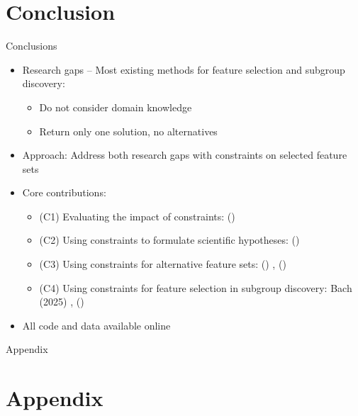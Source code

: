 \documentclass[en, navbarinline, handout]{sdqbeamer}
\renewcommand{\textcite}[1]{\citeauthor{#1} (\citeyear{#1}) \cite{#1}}  %
\begin{document}
\section{Conclusion}

\begin{frame}[t]{Conclusions}
	\begin{itemize}
		\item Research gaps -- Most existing methods for feature selection and subgroup discovery:
		\begin{itemize}
			\item Do not consider domain knowledge
			\item Return only one solution, no alternatives
		\end{itemize}
		\pause
		\vspace{\baselineskip}
		\item Approach: Address both research gaps with constraints on selected feature sets
		\pause
		\vspace{\baselineskip}
		\item Core contributions:
		\begin{itemize}
			\item (C1) Evaluating the impact of constraints: \textcite{bach2022empirical}
			\item (C2) Using constraints to formulate scientific hypotheses: \textcite{bach2022empirical}
			\item (C3) Using constraints for alternative feature sets: \textcite{bach2023finding}, \textcite{bach2024alternative}
			\item (C4) Using constraints for feature selection in subgroup discovery: Bach (2025) \cite{bach2025subgroup}, \textcite{bach2024using} %
		\end{itemize}
		\item All code and data available online
	\end{itemize}
\end{frame}

\appendix
\beginbackup %

\begin{frame}[plain]
	\centering
	\Huge Appendix
\end{frame}

\section{Appendix}
\end{document}
